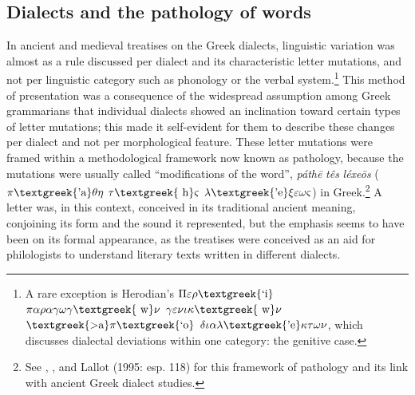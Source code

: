 \documentclass[output=paper]{langsci/langscibook}
\begin{document}
\subsection{Dialects and the pathology of words}
\hypertarget{Toc19704844}{}\begin{styleCatalogusnotities}
In ancient and medieval treatises on the Greek dialects, linguistic variation was almost as a rule discussed per dialect and its characteristic letter mutations, and not per linguistic category such as phonology or the verbal system.\footnote{ \textrm{A rare exception is Herodian’s $\Pi \varepsilon \rho \text{\textgreek{`i}}$ $\pi \alpha \rho \alpha \gamma \omega \gamma \text{\textgreek{~w}}\nu $ $\gamma \varepsilon \nu \iota \kappa \text{\textgreek{~w}}\nu $ $\text{\textgreek{>a}}\pi \text{\textgreek{`o}}$ $\delta \iota \alpha \lambda \text{\textgreek{'e}}\kappa \tau \omega \nu $, which discusses dialectal deviations within one category: the genitive case.}} This method of presentation was a consequence of the widespread assumption among Greek grammarians that individual dialects showed an inclination toward certain types of letter mutations; this made it self-evident for them to describe these changes per dialect and not per morphological feature. These letter mutations were framed within a methodological framework now known as pathology, because the mutations were usually called “modifications of the word”, \textit{páthē} \textit{tês} \textit{léxeōs} ($\pi \text{\textgreek{'a}}\theta \eta $ $\tau \text{\textgreek{~h}}\varsigma $ $\lambda \text{\textgreek{'e}}\xi \varepsilon \omega \varsigma $) in Greek.\footnote{ \textrm{See \citet{Wackernagel1876}, \citet[150]{Siebenborn1976}, and Lallot (1995: esp. 118) for this framework of pathology and its link with ancient Greek dialect studies.}} A letter was, in this context, conceived in its traditional ancient meaning, conjoining its form and the sound it represented, but the emphasis seems to have been on its formal appearance, as the treatises were conceived as an aid for philologists to understand literary texts written in different dialects.
\end{styleCatalogusnotities}
\end{document}
